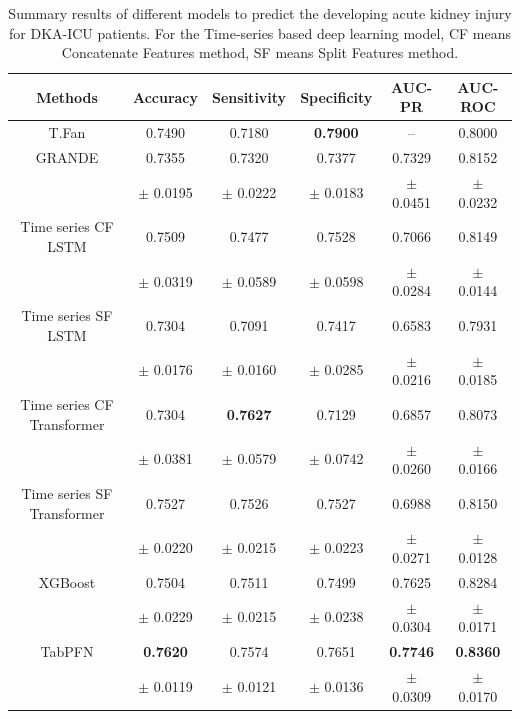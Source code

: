 \documentclass[sn-mathphys-num]{sn-jnl}%
\theoremstyle{thmstyleone}%
\theoremstyle{thmstyletwo}%
\theoremstyle{thmstylethree}%
\begin{document}
\begin{table}[h!]
    \centering
    \caption{Summary results of different models to predict the developing acute kidney injury for DKA-ICU patients. For the Time-series based deep learning model, CF means Concatenate Features method, SF means Split Features method.}
    \label{tab:summary_results}
    \begin{tabular}{|c|c|c|c|c|c|}
        \hline
        \textbf{Methods} & \textbf{Accuracy} & \textbf{Sensitivity} & \textbf{Specificity} & \textbf{AUC-PR} & 
        \textbf{AUC-ROC} \\ \hline
        T.Fan \cite{xgboost-aki-dka} & 0.7490 & 0.7180 & \textbf{0.7900} & -- & 0.8000 \\ \hline
        GRANDE & 0.7355 & 0.7320 & 0.7377 & 0.7329 & 0.8152 \\ 
        & $\pm$ 0.0195 & $\pm$ 0.0222 & $\pm$ 0.0183 & $\pm $ 0.0451 & $\pm$ 0.0232 \\
        \hline
        Time series CF LSTM & 0.7509 & 0.7477 & 0.7528 & 0.7066 &  0.8149 \\ 
        & $\pm$ 0.0319 & $\pm$ 0.0589 & $\pm$ 0.0598 & $\pm$ 0.0284 & $\pm$ 0.0144 \\ 
        \hline
        Time series SF LSTM & 0.7304 & 0.7091 & 0.7417 & 0.6583 & 0.7931 \\ 
        & $\pm$ 0.0176 & $\pm$ 0.0160 & $\pm$ 0.0285 & $\pm$ 0.0216 & $\pm$ 0.0185 \\ 
        \hline
        Time series CF Transformer & 0.7304 & \textbf{0.7627} & 0.7129 & 0.6857 & 0.8073 \\ 
        & $\pm$ 0.0381 & $\pm$ 0.0579 & $\pm$ 0.0742 & $\pm$ 0.0260 & $\pm$ 0.0166 \\ 
        \hline
        Time series SF Transformer & 0.7527 & 0.7526 & 0.7527 & 0.6988 & 0.8150 \\ 
        & $\pm$ 0.0220 & $\pm$ 0.0215 & $\pm$ 0.0223 & $\pm$ 0.0271 & $\pm$ 0.0128 \\ 
        \hline
        XGBoost & 0.7504 & 0.7511 & 0.7499 & 0.7625 & 0.8284 \\ 
        & $\pm$  0.0229 & $\pm$ 0.0215 & $\pm$ 0.0238 & $\pm$ 0.0304 & $\pm$ 0.0171 \\ 
        \hline        
        TabPFN & \textbf{0.7620} & 0.7574 & 0.7651 & \textbf{0.7746} & \textbf{0.8360} \\ 
        & $\pm$ 0.0119 & $\pm$ 0.0121 & $\pm$ 0.0136 & $\pm$ 0.0309 & $\pm$ 0.0170 \\ 
        \hline
    \end{tabular}
\end{table}
\end{document}
